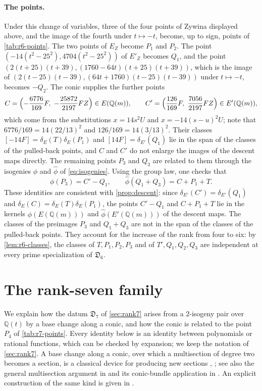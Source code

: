 \documentclass[12pt,oneside,openany]{book}
\theoremstyle{definition}
\theoremstyle{plain}
\numberwithin{equation}{chapter}
\theoremstyle{plain}
\theoremstyle{definition}
\theoremstyle{remark}
\newcommand{\Q}{\mathbb Q}
\newcommand{\sq}[1]{[#1]}
\newcommand{\dual}{\hat\phi}
\newcommand{\datum}{\mathfrak D}
\begin{document}
\paragraph{The points.} Under this change of variables, three of the four points of Zywina displayed above, and the image of the fourth under $t\mapsto-t$, become, up to sign, points of \cref{tab:r6-points}. The two points of $E_Z$ become $P_1$ and $P_2$. The point $(-14(t^2-25^2),4704(t^2-25^2))$ of $E'_Z$ becomes $Q_1$, and the point $(2(t+25)(t+39),(1760-64t)(t+25)(t+39))$, which is the image of $(2(t-25)(t-39),(64t+1760)(t-25)(t-39))$ under $t\mapsto-t$, becomes $-Q_2$. The conic supplies the further points
\[
C=\Bigl(-\frac{6776}{169}F,\ -\frac{25872}{2197}FZ\Bigr)\in E(\Q(m)),\qquad C'=\Bigl(\frac{126}{169}F,\ \frac{7056}{2197}FZ\Bigr)\in E'(\Q(m)),
\]
which come from the substitutions $x=14s^2U$ and $x=-14(s-u)^2U$; note that $6776/169=14(22/13)^2$ and $126/169=14(3/13)^2$. Their classes $\sq{-14F}=\delta_E(T)\delta_E(P_1)$ and $\sq{14F}=\delta_{E'}(Q_1)$ lie in the span of the classes of the pulled-back points, and $C$ and $C'$ do not enlarge the images of the descent maps directly. The remaining points $P_3$ and $Q_3$ are related to them through the isogenies $\phi$ and $\dual$ of \eqref{eq:isogenies}. Using the group law, one checks that
\begin{equation}\label{r6o:halving}
\phi(P_3)=C'-Q_1,\qquad \dual(Q_1+Q_3)=C+P_1+T.
\end{equation}
These identities are consistent with \cref{prop:descent}: since $\delta_{E'}(C')=\delta_{E'}(Q_1)$ and $\delta_E(C)=\delta_E(T)\delta_E(P_1)$, the points $C'-Q_1$ and $C+P_1+T$ lie in the kernels $\phi(E(\Q(m)))$ and $\dual(E'(\Q(m)))$ of the descent maps. The classes of the preimages $P_3$ and $Q_1+Q_3$ are not in the span of the classes of the pulled-back points. They account for the increase of the rank from four to six: by \cref{lem:r6-classes}, the classes of $T,P_1,P_2,P_3$ and of $T',Q_1,Q_2,Q_3$ are independent at every prime specialization of $\datum_6$.
\section{The rank-seven family}\label{sec:origin-r7}

We explain how the datum $\datum_7$ of \cref{sec:rank7}
arises from a $2$-isogeny pair over $\Q(t)$ by a base change along a conic,
and how the conic is related to the point $P_4$ of \cref{tab:r7-points}.
Every identity below is an identity between polynomials
or rational functions, which can be checked by expansion; we keep the
notation of \cref{sec:rank7}. A base change along a conic, over which a
multisection of degree two becomes a section, is a classical device for
producing new sections \cite[\S2.2]{Mestre1991}, \cite[Lecture~III, p.~2003]{Elkies2007}; see also the general multisection argument in \cite[Corollary~4.3]{Salgado2012} and its conic-bundle application in \cite[\S1.2 and Theorem~2.4]{LoughranSalgado2022}. An explicit construction of the
same kind is given in \cite[\S4]{DujellaPeral2024}.
\end{document}
